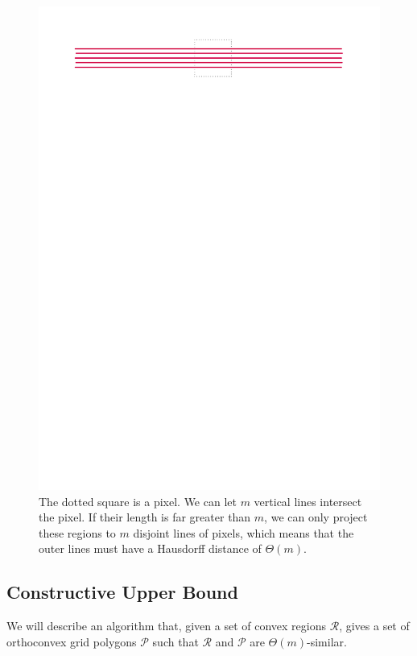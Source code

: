 \documentclass[a4paper,UKenglish,cleveref]{lipics-v2019}
\begin{document}
\begin{figure}
\centering
\includegraphics[scale=0.8]{Figures/linesexample.pdf}
\caption{The dotted square is a pixel. We can let $m$ vertical lines intersect the pixel. If their length is far greater than $m$, we can only project these regions to $m$ disjoint lines of pixels, which means that the outer lines must have a Hausdorff distance of $\Theta(m)$.}
\label{fig:linesexample}
\end{figure}



\subsection{Constructive Upper Bound}
\label{sub:convex_upper}
We will describe an algorithm that, given a set of convex regions \(\mathcal{R}\), gives a set of orthoconvex grid polygons \(\mathcal{P}\) such that \(\mathcal{R}\) and \(\mathcal{P}\) are \(\Theta(m)\)-similar.
\end{document}
